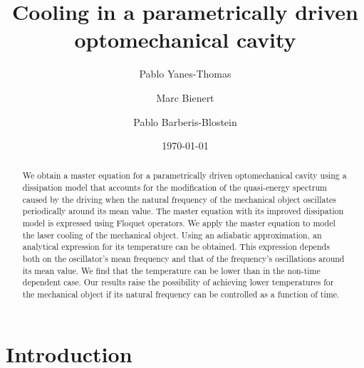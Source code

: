 \documentclass[reprint, amsmath,amssymb, aps,pra]{revtex4-1}
\begin{document}

\title{Cooling in a parametrically driven optomechanical cavity}%

\author{Pablo Yanes-Thomas}

\author{Marc Bienert}

\author{Pablo Barberis-Blostein}

%



\date{\today}

\begin{abstract}

  We obtain a master equation for a parametrically driven
  optomechanical cavity using a dissipation model that accounts for
  the modification of the quasi-energy spectrum caused by the driving
  when the natural frequency of the mechanical object oscillates
  periodically around its mean value. The master equation with its
  improved dissipation model is expressed using Floquet operators. We
  apply the master equation to model the laser cooling of the
  mechanical object. Using an adiabatic approximation, an analytical
  expression for its temperature can be obtained. This expression
  depends both on the oscillator's mean frequency and that of the
  frequency's oscillations around its mean value. We find that the
  temperature can be lower than in the non-time dependent case. Our
  results raise the possibility of achieving lower temperatures for
  the mechanical object if its natural frequency can be controlled as
  a function of time.
\end{abstract}

\maketitle


\section{Introduction}
\end{document}
